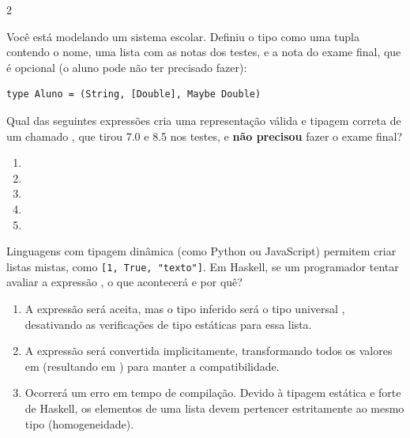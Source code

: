\documentclass[a4paper,10pt,brazil]{article}
\begin{document}
\begin{multicols}{2}
\begin{enumerate}
\end{enumerate}

Você está modelando um sistema escolar. Definiu o tipo  como uma tupla contendo o nome, uma lista com as notas dos testes, e a nota do exame final, que é opcional (o aluno pode não ter precisado fazer):
\begin{verbatim}
type Aluno = (String, [Double], Maybe Double)
\end{verbatim}

Qual das seguintes expressões cria uma representação válida e tipagem correta de um  chamado , que tirou 7.0 e 8.5 nos testes, e \textbf{não precisou} fazer o exame final?

\begin{enumerate}
  \item {}

  \item {}

  \item {}

  \item {}

  \item {}


\end{enumerate}

Linguagens com tipagem dinâmica (como Python ou JavaScript) permitem criar listas mistas, como \texttt{[1, True, "texto"]}. Em Haskell, se um programador tentar avaliar a expressão , o que acontecerá e por quê?

\begin{enumerate}
  \item A expressão será aceita, mas o tipo inferido será o tipo universal , desativando as verificações de tipo estáticas para essa lista.

  \item A expressão será convertida implicitamente, transformando todos os valores em  (resultando em ) para manter a compatibilidade.

  \item Ocorrerá um erro em tempo de compilação. Devido à tipagem estática e forte de Haskell, os elementos de uma lista devem pertencer estritamente ao mesmo tipo (homogeneidade).


\end{enumerate}
\end{multicols}
\end{document}
